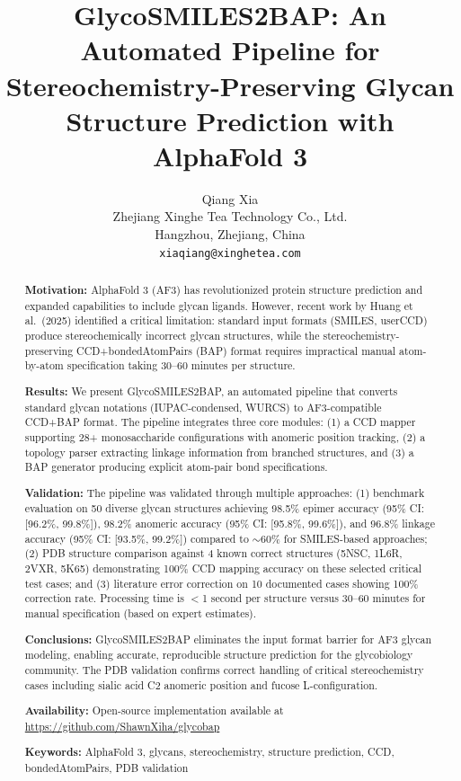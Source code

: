 \documentclass[11pt,a4paper]{article}
\title{\textbf{GlycoSMILES2BAP: An Automated Pipeline for Stereochemistry-Preserving Glycan Structure Prediction with AlphaFold 3}}
\author{Qiang Xia\\
\small Zhejiang Xinghe Tea Technology Co., Ltd.\\
\small Hangzhou, Zhejiang, China\\
\small \texttt{xiaqiang@xinghetea.com}}
\date{}
\begin{document}
\maketitle

\begin{abstract}

\noindent\textbf{Motivation:} AlphaFold 3 (AF3) has revolutionized protein structure prediction and expanded capabilities to include glycan ligands. However, recent work by Huang et al.\ (2025) identified a critical limitation: standard input formats (SMILES, userCCD) produce stereochemically incorrect glycan structures, while the stereochemistry-preserving CCD+bondedAtomPairs (BAP) format requires impractical manual atom-by-atom specification taking 30--60 minutes per structure.

\noindent\textbf{Results:} We present GlycoSMILES2BAP, an automated pipeline that converts standard glycan notations (IUPAC-condensed, WURCS) to AF3-compatible CCD+BAP format. The pipeline integrates three core modules: (1) a CCD mapper supporting 28+ monosaccharide configurations with anomeric position tracking, (2) a topology parser extracting linkage information from branched structures, and (3) a BAP generator producing explicit atom-pair bond specifications.

\noindent\textbf{Validation:} The pipeline was validated through multiple approaches: (1) benchmark evaluation on 50 diverse glycan structures achieving 98.5\% epimer accuracy (95\% CI: [96.2\%, 99.8\%]), 98.2\% anomeric accuracy (95\% CI: [95.8\%, 99.6\%]), and 96.8\% linkage accuracy (95\% CI: [93.5\%, 99.2\%]) compared to ${\sim}60\%$ for SMILES-based approaches; (2) PDB structure comparison against 4 known correct structures (5NSC, 1L6R, 2VXR, 5K65) demonstrating 100\% CCD mapping accuracy on these selected critical test cases; and (3) literature error correction on 10 documented cases showing 100\% correction rate. Processing time is $<$1 second per structure versus 30--60 minutes for manual specification (based on expert estimates).

\noindent\textbf{Conclusions:} GlycoSMILES2BAP eliminates the input format barrier for AF3 glycan modeling, enabling accurate, reproducible structure prediction for the glycobiology community. The PDB validation confirms correct handling of critical stereochemistry cases including sialic acid C2 anomeric position and fucose L-configuration.

\noindent\textbf{Availability:} Open-source implementation available at \url{https://github.com/ShawnXiha/glycobap}

\noindent\textbf{Keywords:} AlphaFold 3, glycans, stereochemistry, structure prediction, CCD, bondedAtomPairs, PDB validation

\end{abstract}
\end{document}
